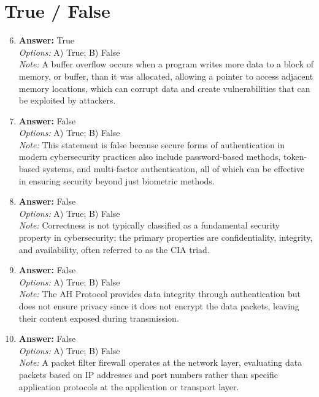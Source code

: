 \documentclass[12pt]{article}
\begin{document}
\section*{True / False}
\begin{enumerate}[label=\arabic*.]
\setcounter{enumi}{5}
\item \textbf{Answer:} True
\\ \textit{Options:} A) True; B) False
\\ \textit{Note:} A buffer overflow occurs when a program writes more data to a block of memory, or buffer, than it was allocated, allowing a pointer to access adjacent memory locations, which can corrupt data and create vulnerabilities that can be exploited by attackers.
\item \textbf{Answer:} False
\\ \textit{Options:} A) True; B) False
\\ \textit{Note:} This statement is false because secure forms of authentication in modern cybersecurity practices also include password-based methods, token-based systems, and multi-factor authentication, all of which can be effective in ensuring security beyond just biometric methods.
\item \textbf{Answer:} False
\\ \textit{Options:} A) True; B) False
\\ \textit{Note:} Correctness is not typically classified as a fundamental security property in cybersecurity; the primary properties are confidentiality, integrity, and availability, often referred to as the CIA triad.
\item \textbf{Answer:} False
\\ \textit{Options:} A) True; B) False
\\ \textit{Note:} The AH Protocol provides data integrity through authentication but does not ensure privacy since it does not encrypt the data packets, leaving their content exposed during transmission.
\item \textbf{Answer:} False
\\ \textit{Options:} A) True; B) False
\\ \textit{Note:} A packet filter firewall operates at the network layer, evaluating data packets based on IP addresses and port numbers rather than specific application protocols at the application or transport layer.
\end{enumerate}
\end{document}
